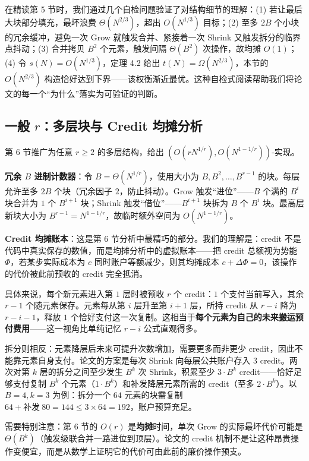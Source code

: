 \documentclass[12pt,a4paper]{ctexart}
\begin{document}
在精读第 5 节时，我们通过几个自检问题验证了对结构细节的理解：(1) 若让最后大块部分填充，最坏浪费 $\Theta(N^{2/3})$，超出 $O(N^{1/3})$ 目标；(2) 至多 $2B$ 个小块的冗余缓冲，避免一次 Grow 就触发合并、紧接着一次 Shrink 又触发拆分的临界点抖动；(3) 合并拷贝 $B^2$ 个元素，触发间隔 $\Theta(B^2)$ 次操作，故均摊 $O(1)$；(4) 令 $s(N) = O(N^{1/3})$，定理 4.2 给出 $t(N) = \Omega(N^{2/3})$，本节的 $O(N^{2/3})$ 构造恰好达到下界——该权衡渐近最优。这种自检式阅读帮助我们将论文的每一个``为什么''落实为可验证的判断。

\subsection{一般 $r$：多层块与 Credit 均摊分析}

第 6 节推广为任意 $r \ge 2$ 的多层结构，给出 $(O(rN^{1/r}), O(N^{1-1/r}))$-实现。

\textbf{冗余 $B$ 进制计数器}：令 $B = \Theta(N^{1/r})$，使用大小为 $B, B^2, \ldots, B^{r-1}$ 的块。每层允许至多 $2B$ 个块（冗余因子 $2$，防止抖动）。Grow 触发``进位''——$B$ 个满的 $B^i$ 块合并为 $1$ 个 $B^{i+1}$ 块；Shrink 触发``借位''——$B^{i+1}$ 块拆为 $B$ 个 $B^i$ 块。最高层新块大小为 $B^{r-1} = N^{1-1/r}$，故临时额外空间为 $O(N^{1-1/r})$。

\textbf{Credit 均摊账本}：这是第 6 节分析中最精巧的部分。我们的理解是：credit 不是代码中真实保存的数值，而是均摊分析中的虚拟账本——把 credit 总额视为势能 $\Phi$，若某步实际成本为 $c$ 同时账户等额减少，则其均摊成本 $c + \Delta\Phi = 0$，该操作的代价被此前预收的 credit 完全抵消。

具体来说，每个新元素进入第 $1$ 层时被预收 $r$ 个 credit：$1$ 个支付当前写入，其余 $r-1$ 个随元素保存。元素每从第 $i$ 层升至第 $i+1$ 层，所持 credit 从 $r-i$ 降为 $r-i-1$，释放 $1$ 个恰好支付这一次复制。这相当于\textbf{每个元素为自己的未来搬运预付费用}——这一视角比单纯记忆 $r-i$ 公式直观得多。

拆分则相反：元素降层后未来可提升次数增加，需要更多而非更少 credit，因此不能靠元素自身支付。论文的方案是每次 Shrink 向每层公共账户存入 $3$ credit。两次对第 $k$ 层的拆分之间至少发生 $B^k$ 次 Shrink，积累至少 $3 \cdot B^k$ credit——恰好足够支付复制 $B^k$ 个元素（$1 \cdot B^k$）和补发降层元素所需的 credit（至多 $2 \cdot B^k$）。以 $B=4, k=3$ 为例：拆分一个 $64$ 元素的块需复制 $64 + \text{补发}\ 80 = 144 \le 3 \times 64 = 192$，账户预算充足。

需要特别注意：第 6 节的 $O(r)$ 是\textbf{均摊}时间，单次 Grow 的实际最坏代价可能是 $\Theta(B^k)$（触发级联合并一路进位到顶层）。论文的 credit 机制不是让这种昂贵操作变便宜，而是从数学上证明它的代价可由此前的廉价操作预支。
\end{document}
